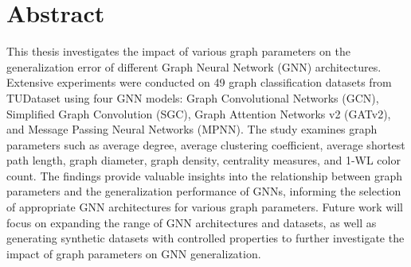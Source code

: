 \chapter*{Abstract}

This thesis investigates the impact of various graph parameters on the generalization error of different Graph Neural Network (GNN) architectures. Extensive experiments were conducted on 49 graph classification datasets from TUDataset using four GNN models: Graph Convolutional Networks (GCN), Simplified Graph Convolution (SGC), Graph Attention Networks v2 (GATv2), and Message Passing Neural Networks (MPNN). The study examines graph parameters such as average degree, average clustering coefficient, average shortest path length, graph diameter, graph density, centrality measures, and 1-WL color count. The findings provide valuable insights into the relationship between graph parameters and the generalization performance of GNNs, informing the selection of appropriate GNN architectures for various graph parameters. Future work will focus on expanding the range of GNN architectures and datasets, as well as generating synthetic datasets with controlled properties to further investigate the impact of graph parameters on GNN generalization.
